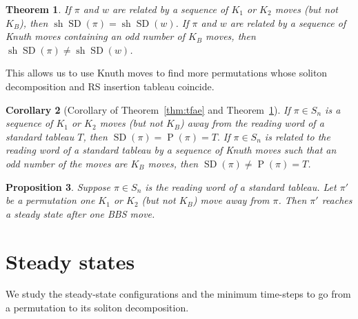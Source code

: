 \documentclass[submission]{FPSAC2021}
\theoremstyle{plain}
\newtheorem{theorem}{Theorem}[section]
\newtheorem{proposition}[theorem]{Proposition}
\newtheorem{corollary}[theorem]{Corollary}
\theoremstyle{definition}
\numberwithin{equation}{section}
\DeclareMathOperator{\sh}{sh}
\DeclareMathOperator{\SDself}{SD}
\DeclareMathOperator{\Ptself}{P}
\newcommand{\SD}[1]{\SDself(#1)}
\renewcommand{\P}[1]{\Ptself(#1)}
\begin{document}
\begin{theorem}\label{thm: knuth paths}
If $\pi$ and $w$ are related by a sequence of $K_1$ or $K_2$ moves (but not $K_B$), then $\sh\SD{\pi}=
\sh\SD{w}$. 
If $\pi$  and $w$ are related by a sequence of Knuth moves containing an odd number of $K_B$ moves, then $\sh \SD{\pi}
\neq
\sh\SD{w}$. 
\end{theorem} 


    
This allows us to use Knuth moves to find more  permutations whose soliton decomposition and RS insertion tableau coincide.
    

\begin{corollary}[Corollary of
Theorem~\ref{thm:tfae}
and 
Theorem~\ref{thm: knuth paths}]
\label{cor: follows directly}
If $\pi\in S_n$ is a sequence of $K_1$ or $K_2$ moves (but not $K_B$) away from the reading word of a standard tableau $T$, 
then $\SD{\pi}=\P{\pi}=T.$ 
If $\pi\in S_n$ is related to the reading word of a standard tableau by a sequence of Knuth moves such that an odd number of the moves are $K_B$ moves, 
 then $\SD{\pi}\neq \P{\pi}=T$.
\end{corollary}

\begin{proposition}
Suppose $\pi\in S_n$ is the reading word of a standard tableau. Let $\pi'$ be a permutation one $K_1$ or $K_2$ (but not $K_B$) move away from $\pi$. Then $\pi'$ reaches a steady state after one BBS move.  
\end{proposition}



\section{Steady states}

We study the steady-state configurations and the minimum time-steps to go from a permutation to its 
soliton decomposition.  
\end{document}

